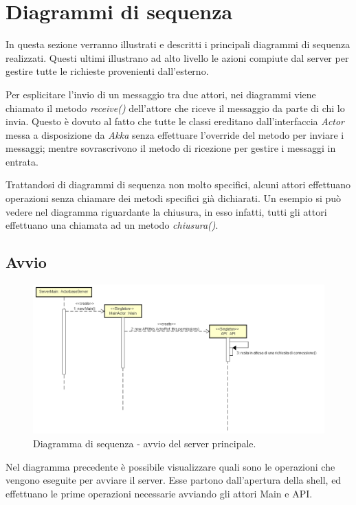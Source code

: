 \documentclass[a4paper]{article}
\begin{document}
                
	\newpage 
	\section{Diagrammi di sequenza}
        In questa sezione verranno illustrati e descritti i principali diagrammi di sequenza realizzati. Questi ultimi illustrano ad alto livello le azioni 
        compiute dal server per gestire tutte le richieste provenienti dall'esterno. 
        
        Per esplicitare l'invio di un messaggio tra due attori, nei diagrammi viene chiamato il metodo \textit{receive()} dell'attore che riceve il messaggio 
        da parte di chi lo invia.
        Questo è dovuto al fatto che tutte le classi ereditano dall'interfaccia \textit{Actor} messa a disposizione da \textit{Akka} senza effettuare 
        l'override del metodo per inviare i messaggi; mentre sovrascrivono il metodo di ricezione per gestire i messaggi in entrata.
        
        Trattandosi di diagrammi di sequenza non molto specifici, alcuni attori effettuano operazioni senza chiamare dei metodi specifici già 
        dichiarati. Un esempio si può vedere nel diagramma riguardante la chiusura, in esso infatti, tutti gli attori effettuano una chiamata ad un metodo 
        \textit{chiusura()}.
       
       \subsection{Avvio}
            \begin{figure} [H]
				\centering
				\includegraphics[width=\textwidth]{ST/seq/AvvioMain.png}
				\caption{Diagramma di sequenza - avvio del server principale.}
			\end{figure}
            Nel diagramma precedente è possibile visualizzare quali sono le operazioni che vengono eseguite per avviare il server. Esse partono dall'apertura 
            della shell, ed effettuano le prime operazioni necessarie avviando gli attori Main e API.
             
\end{document}
